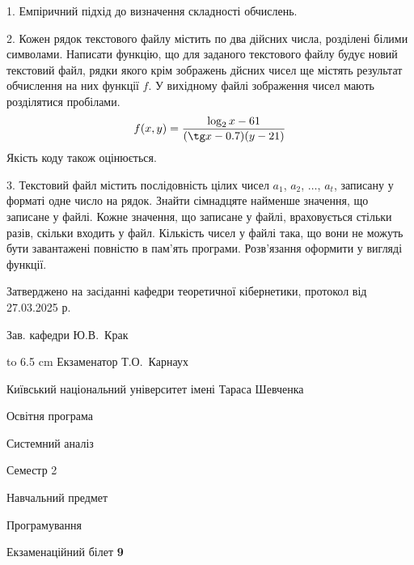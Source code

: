\documentclass[12pt, ukrainian]{article}
\begin{document}
{%
1. Емпіричний підхід до визначення складності обчислень.%
\par
\vspace{2mm}

2. Кожен рядок текстового файлу містить по два дійсних числа, розділені білими символами.
Написати функцію, що для заданого текстового файлу будує новий текстовий файл, рядки якого крім зображень дйсних чисел ще містять результат обчислення на них функції $f$. У вихідному файлі зображення чисел мають розділятися пробілами. 
$$f(x, y) =\frac{\log_{2} x - 61}{(\tg x - 0.7) (y - 21)}$$ 
Якість коду також оцінюється.

\par
\vspace{2mm}

3. Текстовий файл містить послідовність цілих чисел $a_1$, $a_2$, $\ldots$, $a_t$, записану у форматі одне число на рядок. Знайти сімнадцяте найменше значення, що записане у файлі. Кожне значення, що записане у файлі, враховується стільки разів, скільки входить у файл. Кількість чисел у файлі така, що вони не можуть бути завантажені повністю в пам'ять програми. Розв'язання оформити у вигляді функції.

}
{\smallskip\smallskip \begin {scriptsize} Затверджено на засіданні кафедри теоретичної кібернетики, протокол   від   27.03.2025 р.\par\smallskip\smallskip\smallskip\smallskip
{\parbox {6.5 cm} {Зав. кафедри \dotfill Ю.В.~Крак}}\hspace {0.7cm} {\hbox to 6.5 cm { Екзаменатор \dotfill Т.О.~Карнаух}} \end{scriptsize}}
\newpage
{{\begin {scriptsize}\par
{ \center  Київський національний університет імені Тараса Шевченка \par}
{\parbox {5 cm}{Освітня програма \hfill}{\parbox {7 cm}{Системний аналіз\hfill}}\parbox {6 cm}{\hfill Семестр 2}}\par
{\parbox {5 cm} {Навчальний предмет \hfill}\parbox {7 cm}{Програмування \hfill}\parbox {6cm}{\hfill}\par}\vspace{-15pt} \end{scriptsize}}{\center Екзаменаційний білет \No \textbf { 9 }\par}}
\end{document}
